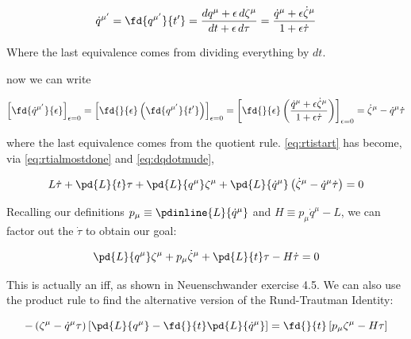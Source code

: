 \documentclass[12pt]{article}
\newcommand{\pmu}{p_\mu}
\numberwithin{equation}{section}
\begin{document}
\begin{equation}
  \dot{q}^{\mu{'}} = \fd{q^{\mu{'}}}{t'} = \frac{dq^\mu + \epsilon\, d\zeta^\mu}{dt + \epsilon\, d\tau} = \frac{\dot{q}^\mu + \epsilon\dot{\zeta}^\mu}{1+\epsilon\dot{\tau}}
\end{equation}

Where the last equivalence comes from dividing everything by $dt$.

now we can write

\begin{equation}
  \label{eq:dqdotmude}
\left[ \fd{\dot{q}^{\mu{'}}}{\epsilon} \right]_{\epsilon=0} =
\left[ \fd{}{\epsilon} \left( \fd{q^{\mu{'}}}{t'} \right) \right]_{\epsilon=0} = 
\left[ \fd{}{\epsilon} \left(  \frac{\dot{q}^\mu + \epsilon\dot{\zeta}^\mu}{1+\epsilon\dot{\tau}} \right) \right]_{\epsilon=0} =
\dot{\zeta}^\mu - \dot{q}^\mu\dot{\tau}
\end{equation}

where the last equivalence comes from the quotient rule. \ref{eq:rtistart} has become, via \ref{eq:rtialmostdone} and \ref{eq:dqdotmude}, 

\begin{equation}
  L\dot{\tau} + \pd{L}{t}\tau + \pd{L}{q^{\mu}}\zeta^\mu +  \pd{L}{\dot{q}^{\mu}} \left( \dot{\zeta}^\mu - \dot{q}^\mu\dot{\tau} \right) = 0
\end{equation}

Recalling our definitions $\pmu \equiv \pdinline{L}{\dot{q}^\mu}$ and $H \equiv \pmu\dot{q}^\mu - L$, we can factor out the $\dot{\tau}$ to obtain our goal:

\begin{equation}
  \pd{L}{q^\mu}\zeta^\mu + p_\mu\dot{\zeta}^\mu + \pd{L}{t}\tau - H\dot{\tau} = 0
\end{equation}

This is actually an iff, as shown in Neuenschwander exercise 4.5. We can also use the product rule to find the alternative version of the Rund-Trautman Identity:

\begin{equation}
-\left( \zeta^\mu - \dot{q}^\mu\tau \right)\left[ \pd{L}{q^\mu} - \fd{}{t}\pd{L}{\dot{q}^\mu}  \right]
    = \fd{}{t}\left[ p_\mu\zeta^\mu - H\tau  \right]
\end{equation}
\end{document}
